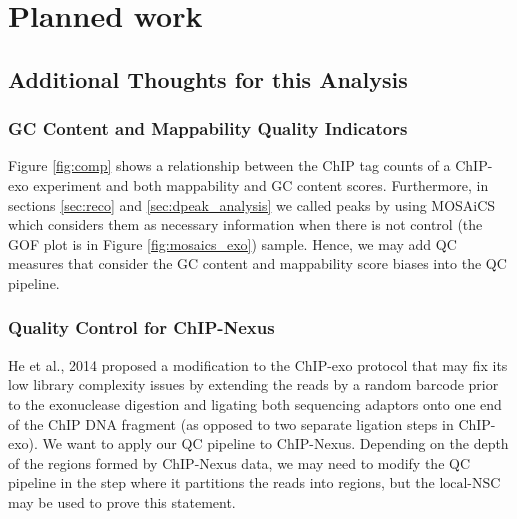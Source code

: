 \documentclass[11pt]{article}\usepackage[]{graphicx}\usepackage[]{color}
\begin{document}
\newpage


\section{Planned work}
\label{sec:future}

\subsection{Additional Thoughts for this Analysis}

\subsubsection{GC Content and Mappability Quality Indicators}
\label{sec:gc_map_qc}

Figure \ref{fig:comp} shows a relationship between the ChIP tag counts
of a ChIP-exo experiment and both mappability and GC content
scores. Furthermore, in sections \ref{sec:reco} and
\ref{sec:dpeak_analysis} we called peaks by using MOSAiCS which
considers them as necessary information when there is not control (the
GOF plot is in Figure \ref{fig:mosaics_exo}) sample. Hence, we may add
QC measures that consider the GC content and mappability score biases
into the QC pipeline.

\subsubsection{Quality Control for ChIP-Nexus}
\label{sec:nexus}


He et al., 2014 \cite{chipnexus} proposed a modification to the
ChIP-exo protocol that may fix its low library complexity issues by
extending the reads by a random barcode prior to the exonuclease
digestion and ligating both sequencing adaptors onto one end of the
ChIP DNA fragment (as opposed to two separate ligation steps in
ChIP-exo). We want to apply our QC pipeline to ChIP-Nexus. Depending
on the depth of the regions formed by ChIP-Nexus data, we may need to
modify the QC pipeline in the step where it partitions the reads into
regions, but the $\mbox{local-NSC}$ may be used to prove this
statement.
\end{document}
